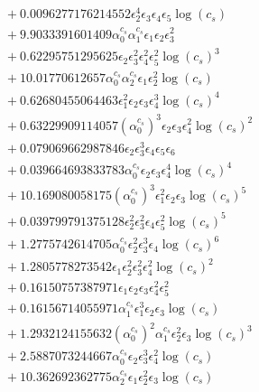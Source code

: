 \documentclass[10pt]{article}
\begin{document}
\begin{align*}
&{}  + 0.0096277176214552 \epsilon_{2}^{4} \epsilon_{3} \epsilon_{4} \epsilon_{5} \log{\left(c_{s} \right)} \\
&{}  + 9.9033391601409 \alpha_{0}^{c_s} \alpha_{1}^{c_s} \epsilon_{1} \epsilon_{2} \epsilon_{3}^{2} \\
&{}  + 0.62295751295625 \epsilon_{2} \epsilon_{3}^{2} \epsilon_{4}^{2} \epsilon_{5}^{2} \log{\left(c_{s} \right)}^{3} \\
&{}  + 10.01770612657 \alpha_{0}^{c_s} \alpha_{2}^{c_s} \epsilon_{1} \epsilon_{2}^{2} \log{\left(c_{s} \right)} \\
&{}  + 0.62680455064463 \epsilon_{1}^{2} \epsilon_{2} \epsilon_{3} \epsilon_{4}^{3} \log{\left(c_{s} \right)}^{4} \\
&{}  + 0.63229909114057 \left(\alpha_{0}^{c_s}\right)^{3} \epsilon_{2} \epsilon_{3} \epsilon_{4}^{2} \log{\left(c_{s} \right)}^{2} \\
&{}  + 0.079069662987846 \epsilon_{2} \epsilon_{3}^{3} \epsilon_{4} \epsilon_{5} \epsilon_{6} \\
&{}  + 0.039664693833783 \alpha_{0}^{c_s} \epsilon_{2} \epsilon_{3} \epsilon_{4}^{4} \log{\left(c_{s} \right)}^{4} \\
&{}  + 10.169080058175 \left(\alpha_{0}^{c_s}\right)^{3} \epsilon_{1}^{2} \epsilon_{2} \epsilon_{3} \log{\left(c_{s} \right)}^{5} \\
&{}  + 0.039799791375128 \epsilon_{2}^{2} \epsilon_{3}^{2} \epsilon_{4} \epsilon_{5}^{2} \log{\left(c_{s} \right)}^{5} \\
&{}  + 1.2775742614705 \alpha_{0}^{c_s} \epsilon_{2}^{2} \epsilon_{3}^{3} \epsilon_{4} \log{\left(c_{s} \right)}^{6} \\
&{}  + 1.2805778273542 \epsilon_{1} \epsilon_{2}^{2} \epsilon_{3}^{2} \epsilon_{4}^{2} \log{\left(c_{s} \right)}^{2} \\
&{}  + 0.16150757387971 \epsilon_{1} \epsilon_{2} \epsilon_{3} \epsilon_{4}^{2} \epsilon_{5}^{2} \\
&{}  + 0.16156714055971 \alpha_{1}^{c_s} \epsilon_{1}^{3} \epsilon_{2} \epsilon_{3} \log{\left(c_{s} \right)} \\
&{}  + 1.2932124155632 \left(\alpha_{0}^{c_s}\right)^{2} \alpha_{1}^{c_s} \epsilon_{2}^{2} \epsilon_{3} \log{\left(c_{s} \right)}^{3} \\
&{}  + 2.5887073244667 \alpha_{0}^{c_s} \epsilon_{2} \epsilon_{3}^{3} \epsilon_{4}^{2} \log{\left(c_{s} \right)} \\
&{}  + 10.362692362775 \alpha_{2}^{c_s} \epsilon_{1} \epsilon_{2}^{2} \epsilon_{3} \log{\left(c_{s} \right)} \\

\end{align*}
\end{document}
